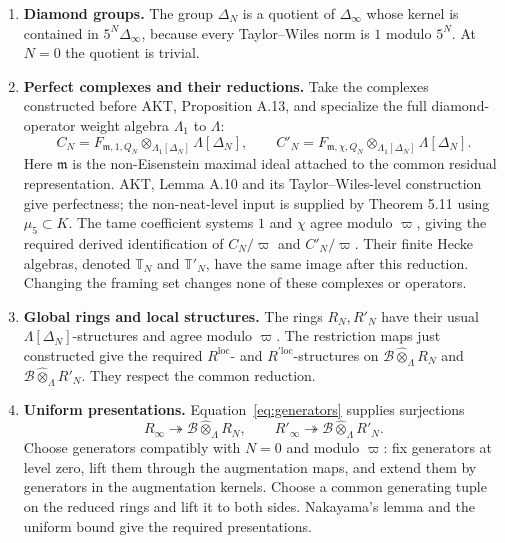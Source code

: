 \documentclass[11pt,a4paper]{article}
\theoremstyle{definition}\newtheorem{definition}[theorem]{Definition}
\theoremstyle{remark}\newtheorem*{remark}{Remark}
\begin{document}
\begin{enumerate}[label=\textbf{\arabic*.},leftmargin=24pt]
\item \textbf{Diamond groups.}
The group $\Delta_N$ is a quotient of $\Delta_\infty$ whose kernel is
contained in $5^N\Delta_\infty$, because every Taylor--Wiles norm is $1$
modulo $5^N$. At $N=0$ the quotient is trivial.

\item \textbf{Perfect complexes and their reductions.}
Take the complexes constructed before AKT, Proposition A.13, and specialize
the full diamond-operator weight algebra $\Lambda_1$ to $\Lambda$:
\[
C_N=F_{\mathfrak m,1,Q_N}\otimes_{\Lambda_1[\Delta_N]}\Lambda[\Delta_N],
\qquad
C'_N=F_{\mathfrak m,\chi,Q_N}\otimes_{\Lambda_1[\Delta_N]}\Lambda[\Delta_N].
\]
Here $\mathfrak m$ is the non-Eisenstein maximal ideal attached to the
common residual representation. AKT, Lemma A.10 and its Taylor--Wiles-level
construction give perfectness; the non-neat-level input is supplied by
Theorem 5.11 using $\mu_5\subset K$. The tame coefficient systems $1$ and
$\chi$ agree modulo $\varpi$, giving the required derived identification of
$C_N/\varpi$ and $C'_N/\varpi$. Their finite Hecke algebras, denoted
$\mathbb T_N$ and $\mathbb T'_N$, have the same image after this reduction.
Changing the framing set changes none of these complexes or operators.

\item \textbf{Global rings and local structures.}
The rings $R_N,R'_N$ have their usual $\Lambda[\Delta_N]$-structures and
agree modulo $\varpi$. The restriction maps just constructed give the
required $R^{\mathrm{loc}}$- and $R^{\prime\mathrm{loc}}$-structures on
$\mathcal B\widehat\otimes_\Lambda R_N$ and
$\mathcal B\widehat\otimes_\Lambda R'_N$. They respect the common reduction.

\item \textbf{Uniform presentations.}
Equation~\eqref{eq:generators} supplies surjections
\[
R_\infty\twoheadrightarrow\mathcal B\widehat\otimes_\Lambda R_N,
\qquad
R'_\infty\twoheadrightarrow\mathcal B\widehat\otimes_\Lambda R'_N.
\]
Choose generators compatibly with $N=0$ and modulo $\varpi$: fix generators
at level zero, lift them through the augmentation maps, and extend them by
generators in the augmentation kernels. Choose a common generating tuple
on the reduced rings and lift it to both sides. Nakayama's lemma and the
uniform bound give the required presentations.


\end{enumerate}
\end{document}
